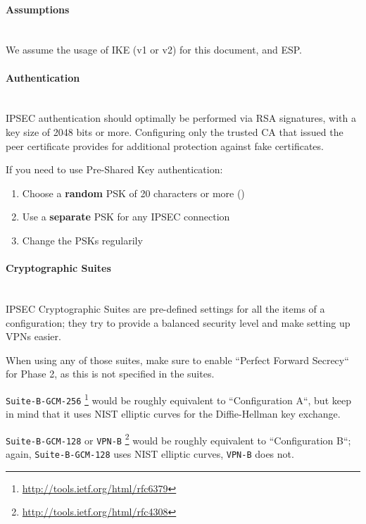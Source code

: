 \paragraph*{Assumptions}\mbox{}\\

We assume the usage of IKE (v1 or v2) for this document, and ESP.

\paragraph*{Authentication}\mbox{}\\

IPSEC authentication should optimally be performed via RSA signatures,
with a key size of 2048 bits or more. Configuring only the trusted CA
that issued the peer certificate provides for additional protection
against fake certificates.

If you need to use Pre-Shared Key authentication:

\begin{enumerate}
\item Choose a \textbf{random} PSK of 20 characters or more ()
\item Use a \textbf{separate} PSK for any IPSEC connection
\item Change the PSKs regularily
\end{enumerate}

\paragraph*{Cryptographic Suites}\mbox{}\\

IPSEC Cryptographic Suites are pre-defined settings for all the
items of a configuration; they try to provide a balanced security
level and make setting up VPNs easier.

When using any of those suites, make sure to enable ``Perfect Forward
Secrecy`` for Phase 2, as this is not specified in the suites.

\verb|Suite-B-GCM-256| \footnote{\url{http://tools.ietf.org/html/rfc6379}}
would be roughly equivalent to ``Configuration A``, but keep in mind
that it uses NIST elliptic curves for the Diffie-Hellman key exchange.

\verb|Suite-B-GCM-128| or
\verb|VPN-B| \footnote{\url{http://tools.ietf.org/html/rfc4308}} would
be roughly equivalent to ``Configuration B``; again,
\verb|Suite-B-GCM-128| uses NIST elliptic curves, \verb|VPN-B| does
not.

